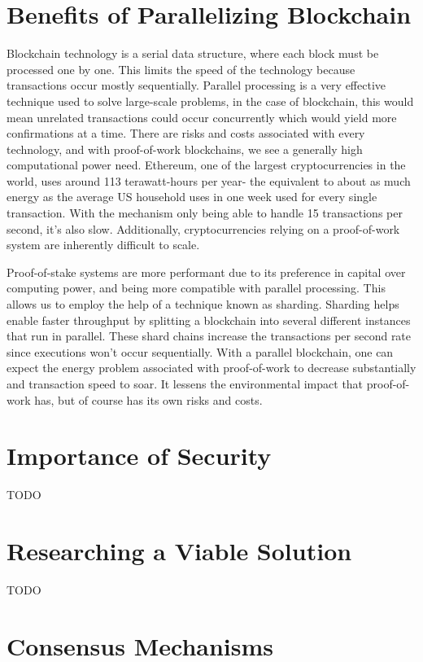 \section{Benefits of Parallelizing Blockchain}

Blockchain technology is a serial data structure, where each block must be processed one by one. This limits the speed of the technology because transactions occur mostly sequentially. Parallel processing is a very effective technique used to solve large-scale problems, in the case of blockchain, this would mean unrelated transactions could occur concurrently which would yield more confirmations at a time. 
There are risks and costs associated with every technology, and with proof-of-work blockchains, we see a generally high computational power need. Ethereum, one of the largest cryptocurrencies in the world, uses around 113 terawatt-hours per year- the equivalent to about as much energy as the average US household uses in one week used for every single transaction. With the mechanism only being able to handle 15 transactions per second, it’s also slow. Additionally, cryptocurrencies relying on a proof-of-work system are inherently difficult to scale.

Proof-of-stake systems are more performant due to its preference in capital over computing power, and being more compatible with parallel processing. This allows us to employ the help of a technique known as sharding. Sharding helps enable faster throughput by splitting a blockchain into several different instances that run in parallel. These shard chains increase the transactions per second rate since executions won’t occur sequentially. With a parallel blockchain, one can expect the energy problem associated with proof-of-work to decrease substantially and transaction speed to soar. It lessens the environmental impact that proof-of-work has, but of course has its own risks and costs.

\section{Importance of Security}

TODO

\section{Researching a Viable Solution}

TODO

\section{Consensus Mechanisms}

